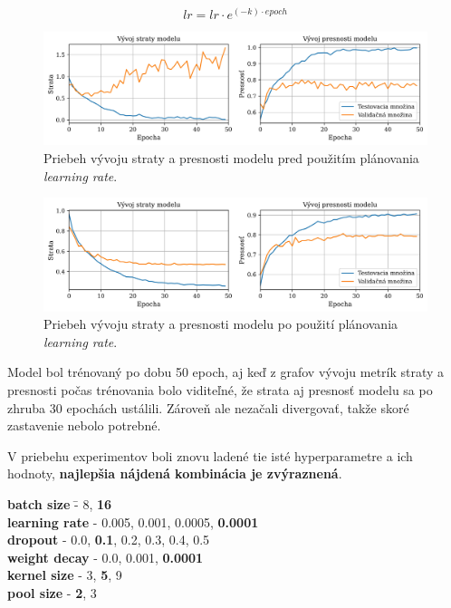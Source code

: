 \begin{equation} 
    \label{eq:20}
    lr = lr \cdot e^{(-k) \cdot epoch}
\end{equation}

\begin{figure}[H]    
    \includegraphics[scale=0.074]{img/metrics_before.jpg}
    \caption{Priebeh vývoju straty a presnosti modelu pred použitím plánovania \textit{learning rate}.}
    \label{fig:metrics_before}
\end{figure}

\begin{figure}[H]    
    \includegraphics[scale=0.074]{img/metrics_after.jpg}
    \caption{Priebeh vývoju straty a presnosti modelu po použití plánovania \textit{learning rate}.}
    \label{fig:metrics_after}
\end{figure}

Model bol trénovaný po dobu 50 epoch, aj keď z grafov vývoju metrík straty a presnosti počas trénovania bolo viditeľné, že strata aj presnosť modelu sa po zhruba 30 epochách ustálili. Zároveň ale nezačali divergovať, takže skoré zastavenie nebolo potrebné.

V priebehu experimentov boli znovu ladené tie isté hyperparametre a ich hodnoty, \textbf{najlepšia nájdená kombinácia je zvýraznená}.
\begin{tabbing}
    \indent \textbf{batch size} \quad\quad\quad\quad \= - 8, \textbf{16}\\
    \indent \textbf{learning rate}                   \> - 0.005, 0.001, 0.0005, \textbf{0.0001}\\
    \indent \textbf{dropout}                         \> - 0.0, \textbf{0.1}, 0.2, 0.3, 0.4, 0.5\\
    \indent \textbf{weight decay}                    \> - 0.0, 0.001, \textbf{0.0001}\\
    \indent \textbf{kernel size}                     \> - 3, \textbf{5}, 9\\
    \indent \textbf{pool size}                       \> - \textbf{2}, 3\\
\end{tabbing}


